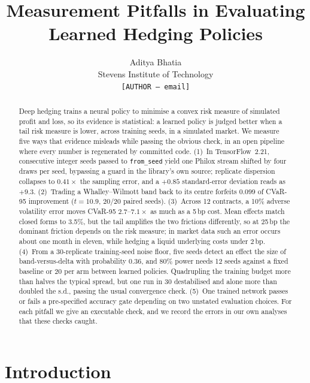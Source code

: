 \documentclass{article}
\title{Measurement Pitfalls in Evaluating Learned Hedging Policies}
\author{%
  Aditya Bhatia \\
  Stevens Institute of Technology \\
  \texttt{[AUTHOR --- email]}
}
\newcommand{\cvar}{CVaR-95}
\newcommand{\fromseed}{\texttt{from\_seed}}
\newcommand{\bps}{\,bp}
\begin{document}
\maketitle

\begin{abstract}
Deep hedging trains a neural policy to minimise a convex risk measure of simulated profit and
loss, so its evidence is statistical: a learned policy is judged better when a tail risk measure
is lower, across training seeds, in a simulated market. We measure five ways that evidence
misleads while passing the obvious check, in an open pipeline where every number is regenerated
by committed code. (1)~In TensorFlow~2.21, consecutive integer seeds passed to \fromseed{} yield
one Philox stream shifted by four draws per seed, bypassing a guard in the library's own source;
replicate dispersion collapses to $0.41\times$ the sampling error, and a $+0.85$ standard-error
deviation reads as $+9.3$. (2)~Trading a Whalley--Wilmott band back to its centre forfeits $0.099$
of \cvar{} improvement ($t = 10.9$, 20/20 paired seeds). (3)~Across 12 contracts, a 10\% adverse
volatility error moves \cvar{} $2.7$--$7.1\times$ as much as a 5\bps{} cost. Mean effects match
closed forms to 3.5\%, but the tail amplifies the two frictions differently, so at 25\bps{} the
dominant friction depends on the risk measure; in market data such an error occurs about one
month in eleven, while hedging a liquid underlying costs under 2\bps. (4)~From a 30-replicate
training-seed noise floor, five seeds detect an effect the size of band-versus-delta with
probability $0.36$, and 80\% power needs 12 seeds against a fixed baseline or 20 per arm between
learned policies. Quadrupling the training budget more than halves the typical spread, but one
run in 30 destabilised and alone more than doubled the s.d., passing the usual convergence check.
(5)~One trained network passes or fails a pre-specified accuracy gate depending on two unstated
evaluation choices. For each pitfall we give an executable check, and we record the errors in our
own analyses that these checks caught.
\end{abstract}

\section{Introduction}\label{sec:intro}
\end{document}
